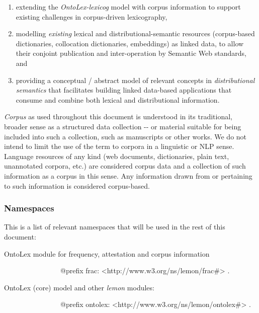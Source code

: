 \documentclass[a4paper]{article}
\newcommand\textstyleEmphasis[1]{\textit{#1}}
\newcommand\textstyleSourceText[1]{\textrm{#1}}
\newcommand\liststyleWWNumiv{%
\renewcommand\theenumi{\arabic{enumi}}
\renewcommand\theenumii{\arabic{enumii}}
\renewcommand\theenumiii{\arabic{enumiii}}
\renewcommand\theenumiv{\arabic{enumiv}}
\renewcommand\labelenumi{\theenumi.}
\renewcommand\labelenumii{\theenumii.}
\renewcommand\labelenumiii{\theenumiii.}
\renewcommand\labelenumiv{\theenumiv.}
}
\begin{document}
\liststyleWWNumiv
\begin{enumerate}
\item extending the \textstyleEmphasis{OntoLex-lexicog} model with corpus information to support existing challenges in corpus-driven lexicography, 
\item modelling \textstyleEmphasis{existing} lexical and distributional-semantic resources (corpus-based dictionaries, collocation dictionaries, embeddings) as linked data, to allow their conjoint publication and inter-operation by Semantic Web standards, and 
\item providing a conceptual / abstract model of relevant concepts in \textstyleEmphasis{distributional semantics} that facilitates building linked data-based applications that consume and combine both lexical and distributional information. 
\end{enumerate}
\textstyleEmphasis{Corpus} as used throughout this document is understood in its traditional, broader sense as a structured data collection -{}- or material suitable for being included into such a collection, such as manuscripts or other works. We do not intend to limit the use of the term to corpora in a linguistic or NLP sense. Language resources of any kind (web documents, dictionaries, plain text, unannotated corpora, etc.) are considered {\textquotedbl}corpus data{\textquotedbl} and a collection of such information as a {\textquotedbl}corpus{\textquotedbl} in this sense. Any information drawn from or pertaining to such information is considered {\textquotedbl}corpus-based{\textquotedbl}. 

\subsubsection[Namespaces ]{%
%
%
Namespaces }
This is a list of relevant namespaces that will be used in the rest of this document: 

OntoLex module for frequency, attestation and corpus information 


\bigskip

\textstyleSourceText{\ \ \ \ \ \ \ \ \ \ \ \ \ \ \ \ @prefix frac: {\textless}http://www.w3.org/ns/lemon/frac\#{\textgreater} .}


\bigskip


\bigskip

OntoLex (core) model and other \textstyleEmphasis{lemon} modules: 


\bigskip

\textstyleSourceText{\ \ \ \ \ \ \ \ \ \ \ \ \ \ \ \ @prefix ontolex: {\textless}http://www.w3.org/ns/lemon/ontolex\#{\textgreater} .}
\end{document}
